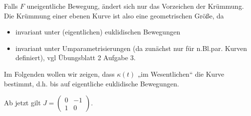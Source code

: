 \documentclass{mycourse}
\begin{document}
\begin{note}
Falls $F$ uneigentliche Bewegung, ändert sich nur das Vorzeichen der Krümmung. Die Krümmung einer ebenen Kurve ist also eine geometrischen Größe, da
\begin{itemize}
	\item invariant unter (eigentlichen) euklidischen Bewegungen
	\item invariant unter Umparametrisierungen (da zunächst nur für n.Bl.par. Kurven definiert), vgl Übungsblatt 2 Aufgabe 3.
\end{itemize}
Im Folgenden wollen wir zeigen, dass $\kappa(t)$ „im Wesentlichen“ die Kurve bestimmt, d.h. bis auf eigentliche euklidische Bewegungen.
\end{note}

Ab jetzt gilt $J = \begin{pmatrix} 0 & -1 \\ 1 & 0 \end{pmatrix}$.
\end{document}
